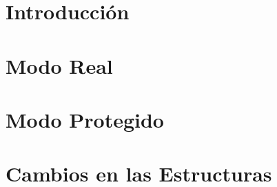 \documentclass[a4paper,10pt, nofootinbib]{article}
\begin{document}
\maketitle

\tableofcontents
\clearpage

\thispagestyle{empty}


\clearpage


\section{Introducci\'on}

\clearpage

\section{Modo Real}

\clearpage

\section{Modo Protegido}

\clearpage

\section{Cambios en las Estructuras}

\clearpage


\clearpage
\end{document}
